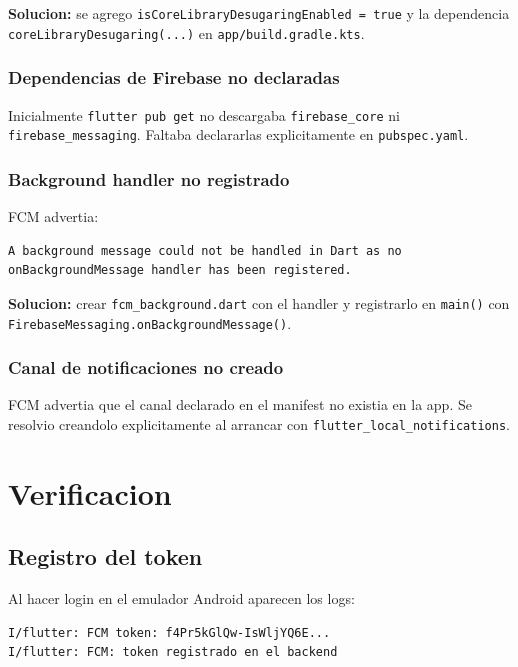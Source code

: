\textbf{Solucion:} se agrego \texttt{isCoreLibraryDesugaringEnabled = true} y la dependencia \texttt{coreLibraryDesugaring(...)} en \texttt{app/build.gradle.kts}.

\subsubsection{Dependencias de Firebase no declaradas}

Inicialmente \texttt{flutter pub get} no descargaba \texttt{firebase\_core} ni \texttt{firebase\_messaging}. Faltaba declararlas explicitamente en \texttt{pubspec.yaml}.

\subsubsection{Background handler no registrado}

FCM advertia:

\begin{lstlisting}[language=bash]
A background message could not be handled in Dart as no
onBackgroundMessage handler has been registered.
\end{lstlisting}

\textbf{Solucion:} crear \texttt{fcm\_background.dart} con el handler y registrarlo en \texttt{main()} con \texttt{FirebaseMessaging.onBackgroundMessage()}.

\subsubsection{Canal de notificaciones no creado}

FCM advertia que el canal declarado en el manifest no existia en la app. Se resolvio creandolo explicitamente al arrancar con \texttt{flutter\_local\_notifications}.

\section{Verificacion}

\subsection{Registro del token}

Al hacer login en el emulador Android aparecen los logs:

\begin{lstlisting}[language=bash]
I/flutter: FCM token: f4Pr5kGlQw-IsWljYQ6E...
I/flutter: FCM: token registrado en el backend
\end{lstlisting}

